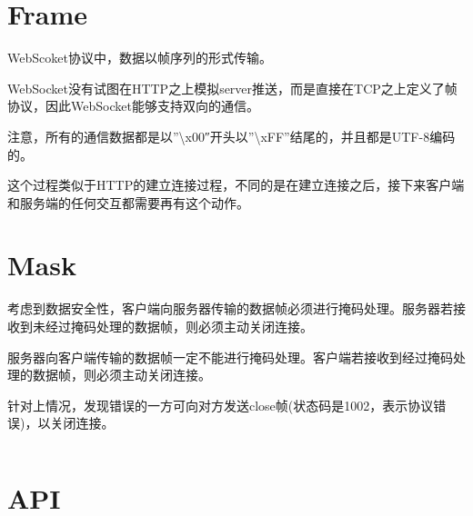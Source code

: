 \begin{lstlisting}[language=PHP]

\end{lstlisting}



\begin{lstlisting}[language=PHP]

\end{lstlisting}






\section{Frame}


WebScoket协议中，数据以帧序列的形式传输。

WebSocket没有试图在HTTP之上模拟server推送，而是直接在TCP之上定义了帧协议，因此WebSocket能够支持双向的通信。

注意，所有的通信数据都是以”\textbackslash x00″开头以”\textbackslash xFF”结尾的，并且都是UTF-8编码的。

这个过程类似于HTTP的建立连接过程，不同的是在建立连接之后，接下来客户端和服务端的任何交互都需要再有这个动作。

\section{Mask}


考虑到数据安全性，客户端向服务器传输的数据帧必须进行掩码处理。服务器若接收到未经过掩码处理的数据帧，则必须主动关闭连接。

服务器向客户端传输的数据帧一定不能进行掩码处理。客户端若接收到经过掩码处理的数据帧，则必须主动关闭连接。

针对上情况，发现错误的一方可向对方发送close帧(状态码是1002，表示协议错误)，以关闭连接。





\begin{lstlisting}[language=PHP]

\end{lstlisting}

\section{API}






